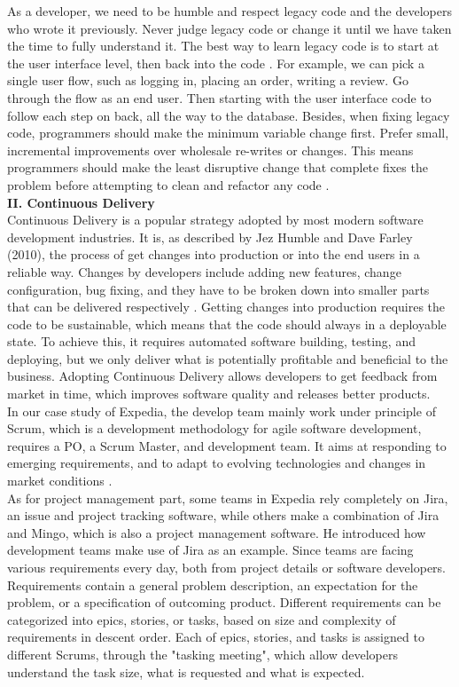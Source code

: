 \documentclass[11pt]{article}
\begin{document}
As a developer, we need to be humble and respect legacy code and the developers who wrote it previously. Never judge legacy code or change it until we have taken the time to fully understand it. The best way to learn legacy code is to start at the user interface level, then back into the code \cite{no4}. For example, we can pick a single user flow, such as logging in, placing an order, writing a review. Go through the flow as an end user. Then starting with the user interface code to follow each step on back, all the way to the database. Besides, when fixing legacy code, programmers should make the minimum variable change \cite{no4} first. Prefer small, incremental improvements over wholesale re-writes or changes. This means programmers should make the least disruptive change that complete fixes the problem before attempting to clean and refactor any code \cite{no4}. \\[10px]
{\bf II. Continuous Delivery}\\[10px]
Continuous Delivery is a popular strategy adopted by most modern software development industries. It is, as described by Jez Humble and Dave Farley (2010), the process of get changes into production or into the end users in a reliable way. Changes by developers include adding new features, change configuration, bug fixing, and they have to be broken down into smaller parts that can be delivered respectively \cite{no5}. Getting changes into production requires the code to be sustainable, which means that the code should always in a deployable state. To achieve this, it requires automated software building, testing, and deploying, but we only deliver what is potentially profitable and beneficial to the business. Adopting Continuous Delivery allows developers to get feedback from market in time, which improves software quality and releases better products. \\[10px]
In our case study of Expedia, the develop team mainly work under principle of Scrum, which is a development methodology for agile software development, requires a PO, a Scrum Master, and development team. It aims at responding to emerging requirements, and to adapt to evolving technologies and changes in market conditions \cite{no6}. \\[10px]
As for project management part, some teams in Expedia rely completely on Jira, an issue and project tracking software, while others make a combination of Jira and Mingo, which is also a project management software. He introduced how development teams make use of Jira as an example. Since teams are facing various requirements every day, both from project details or software developers. Requirements contain a general problem description, an expectation for the problem, or a specification of outcoming product. Different requirements can be categorized into epics, stories, or tasks, based on size and complexity of requirements in descent order. Each of epics, stories, and tasks is assigned to different Scrums, through the "tasking meeting", which allow developers understand the task size, what is requested and what is expected. \\[10px]
\end{document}
